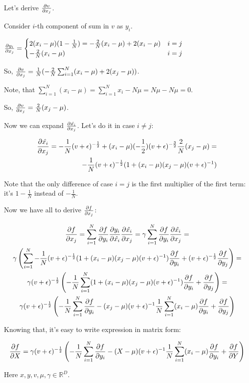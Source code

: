 \documentclass[12pt]{article}
\begin{document}
Let's derive $\pdv{v}{x_j}$.

Consider $i$-th component of sum in $v$ as $y_i$.

$
\pdv{y_i}{x_j} = 
\begin{cases}
2 (x_i - \mu) (1 - \frac{1}{N}) = -\frac{2}{N} (x_i - \mu) + 2(x_i - \mu) & \text{$i = j$} \\
-\frac{2}{N} (x_i - \mu) & \text{$i = j$}
\end{cases}
$ 

So, $\pdv{v}{x_j} = \frac{1}{N} ( -\frac{2}{N} \sum_{i=1}^{N}(x_i - \mu) + 2(x_j - \mu))$.

Note, that $\sum_{i=1}^{N}(x_i - \mu) = \sum_{i=1}^{N} x_i - N \mu = N \mu - N \mu = 0$.

So, $\pdv{v}{x_j} = \frac{2}{N} (x_j - \mu)$.

Now we can expand $\pdv{\hat{x_i}}{x_j}$. Let's do it in case $i \ne j$:

\begin{gather*}
\begin{split}
\pdv{\hat{x_i}}{x_j} =
-\frac{1}{N} (v + \epsilon)^{-\frac{1}{2}} + (x_i - \mu) (-\frac{1}{2}) (v + \epsilon)^{-\frac{3}{2}} \frac{2}{N}(x_j - \mu) = \\
-\frac{1}{N} (v + \epsilon)^{-\frac{1}{2}} (1 + (x_i - \mu) (x_j - \mu) (v + \epsilon)^{-1})
\end{split}
\end{gather*}

Note that the only difference of case $i = j$ is the first multiplier of the first term: it's $1 - \frac{1}{N}$ instead of $-\frac{1}{N}$.

Now we have all to derive $\pdv{f}{x_j}$:

\begin{gather*}
\pdv{f}{x_j} = 
\sum_{i=1}^{N} \pdv{f}{y_i} \pdv{y_i}{\hat{x_i}} \pdv{\hat{x_i}}{x_j} = 
\gamma \sum_{i=1}^{N} \pdv{f}{y_i} \pdv{\hat{x_i}}{x_j} = \\
\gamma \left( \sum_{i=1}^{N} -\frac{1}{N} (v + \epsilon)^{-\frac{1}{2}} (1 + (x_i - \mu) (x_j - \mu) (v + \epsilon)^{-1}) \pdv{f}{y_i} + (v + \epsilon)^{-\frac{1}{2}} \pdv{f}{y_j} \right) = \\
\gamma (v + \epsilon)^{-\frac{1}{2}} \left( -\frac{1}{N} \sum_{i=1}^{N} (1 + (x_i - \mu) (x_j - \mu) (v + \epsilon)^{-1}) \pdv{f}{y_i} + \pdv{f}{y_j} \right) = \\
\gamma (v + \epsilon)^{-\frac{1}{2}} \left( -\frac{1}{N} \sum_{i=1}^{N} \pdv{f}{y_i} - (x_j - \mu) (v + \epsilon)^{-1} \frac{1}{N} \sum_{i=1}^{N} (x_i - \mu) \pdv{f}{y_i} + \pdv{f}{y_j} \right)
\end{gather*}

\newpage

Knowing that, it's easy to write expression in matrix form:

\[
	\pdv{f}{X} = \gamma (v + \epsilon)^{-\frac{1}{2}} \left( -\frac{1}{N} \sum_{i=1}^{N} \pdv{f}{y_i} - (X - \mu) (v + \epsilon)^{-1} \frac{1}{N} \sum_{i=1}^{N} (x_i - \mu) \pdv{f}{y_i} + \pdv{f}{Y} \right) 
\]

Here $x, y, v, \mu, \gamma \in \mathbb{R}^D$.
\end{document}
